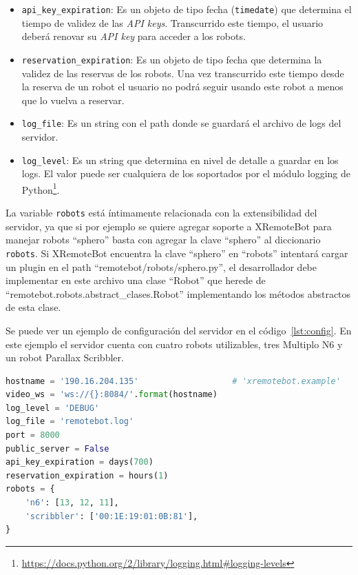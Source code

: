 \begin{itemize}
    \item \texttt{api\_key\_expiration}: Es un objeto de tipo fecha
        (\texttt{timedate}) que determina el tiempo de validez
        de las \textit{API keys}. Transcurrido este tiempo, el
        usuario deberá renovar su \textit{API key} para acceder
        a los robots.
    \item \texttt{reservation\_expiration}: Es un objeto de tipo
        fecha que determina la validez de las reservas de los robots.
        Una vez transcurrido este tiempo desde la reserva de un robot
        el usuario no podrá seguir usando este robot a menos que lo
        vuelva a reservar.
    \item \texttt{log\_file}: Es un string con el path donde se
        guardará el archivo de logs del servidor.
    \item \texttt{log\_level}: Es un string que determina en nivel
        de detalle a guardar en los logs. El valor puede ser
        cualquiera de los soportados por el módulo logging de
        Python\footnote{\url{https://docs.python.org/2/library/logging.html\#logging-levels}}.
\end{itemize}

La variable \texttt{robots} está íntimamente
relacionada con la extensibilidad del servidor, ya que si por ejemplo
se quiere agregar soporte a XRemoteBot para manejar robots ``sphero''
basta con agregar la clave ``sphero'' al diccionario
\texttt{robots}. Si XRemoteBot encuentra la clave ``sphero'' en ``robots''
intentará cargar un plugin en el path
``remotebot/robots/sphero.py'',
el desarrollador debe implementar en este archivo una clase ``Robot''
que herede de ``remotebot.robots.abstract\_clases.Robot'' implementando
los métodos abstractos de esta clase.

Se puede ver un ejemplo de configuración del servidor en el
código~\ref{lst:config}. En este ejemplo el servidor cuenta
con cuatro robots utilizables, tres Multiplo N6 y un robot
Parallax Scribbler.

\begin{lstlisting}[language=python,
    caption={Configuración de ejemplo de XRemoteBot en
    \texttt{configuration.py}},
    label=lst:config]
hostname = '190.16.204.135'                   # 'xremotebot.example'
video_ws = 'ws://{}:8084/'.format(hostname)
log_level = 'DEBUG'
log_file = 'remotebot.log'
port = 8000
public_server = False
api_key_expiration = days(700)
reservation_expiration = hours(1)
robots = {
    'n6': [13, 12, 11],
    'scribbler': ['00:1E:19:01:0B:81'],
}
\end{lstlisting}

